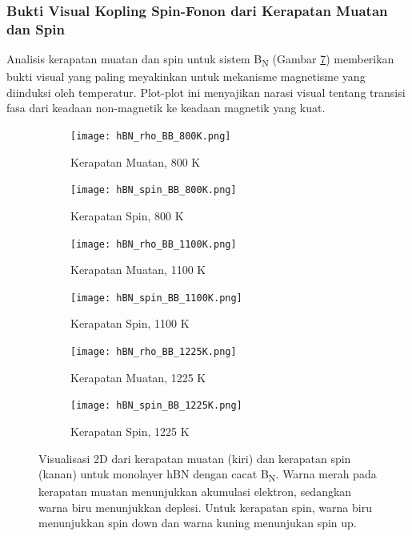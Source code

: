 \subsubsection{Bukti Visual Kopling Spin-Fonon dari Kerapatan Muatan dan Spin}
\label{subsec:hbn_BB_density_analysis}
Analisis kerapatan muatan dan spin untuk sistem B\textsubscript{N} (Gambar \ref{fig:hbn_BB_density}) memberikan bukti visual yang paling meyakinkan untuk mekanisme magnetisme yang diinduksi oleh temperatur.
Plot-plot ini menyajikan narasi visual tentang transisi fasa dari keadaan non-magnetik ke keadaan magnetik yang kuat.
\begin{figure}[htbp!] %
  \centering
  \begin{subfigure}[b]{0.49\textwidth}
    \centering
    \texttt{[image: hBN\_rho\_BB\_800K.png]}
    \caption{Kerapatan Muatan, 800 K}
    \label{subfig:rho_bb_800k}
  \end{subfigure}\hfill
  \begin{subfigure}[b]{0.49\textwidth}
    \centering
    \texttt{[image: hBN\_spin\_BB\_800K.png]}
    \caption{Kerapatan Spin, 800 K}
    \label{subfig:spin_bb_800k}
  \end{subfigure}
  \vspace{1em}

  \begin{subfigure}[b]{0.49\textwidth}
    \centering
    \texttt{[image: hBN\_rho\_BB\_1100K.png]}
    \caption{Kerapatan Muatan, 1100 K}
    \label{subfig:rho_bb_1100k}
  \end{subfigure}\hfill
  \begin{subfigure}[b]{0.49\textwidth}
    \centering
    \texttt{[image: hBN\_spin\_BB\_1100K.png]}
    \caption{Kerapatan Spin, 1100 K}
    \label{subfig:spin_bb_1100k}
  \end{subfigure}
  \vspace{1em}

  \begin{subfigure}[b]{0.49\textwidth}
    \centering
    \texttt{[image: hBN\_rho\_BB\_1225K.png]}
    \caption{Kerapatan Muatan, 1225 K}
    \label{subfig:rho_bb_1225k}
  \end{subfigure}\hfill
  \begin{subfigure}[b]{0.49\textwidth}
    \centering
    \texttt{[image: hBN\_spin\_BB\_1225K.png]}
    \caption{Kerapatan Spin, 1225 K}
    \label{subfig:spin_bb_1225k}
  \end{subfigure}
  \caption{Visualisasi 2D dari kerapatan muatan (kiri) dan kerapatan spin (kanan) untuk monolayer hBN dengan cacat B\textsubscript{N}. Warna merah pada kerapatan muatan menunjukkan akumulasi elektron, sedangkan warna biru menunjukkan deplesi. Untuk kerapatan spin, warna biru menunjukkan spin down dan warna kuning menunjukan spin up.}
  \label{fig:hbn_BB_density}
\end{figure}

